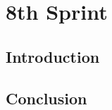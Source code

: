 \graphicspath{{./assets/}}
\setcounter{mtc}{5}
\chapter{ 8th Sprint }

\minitoc
\newpage
\section*{Introduction}


\section*{Conclusion}
